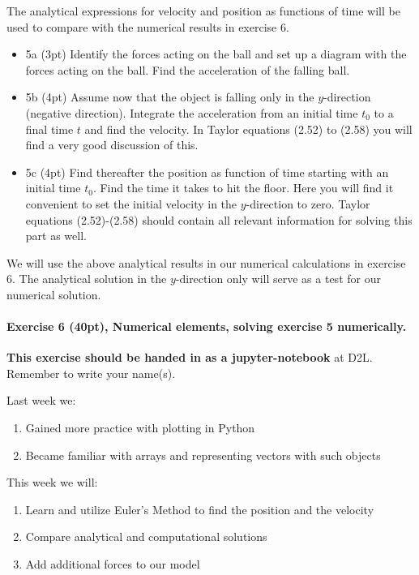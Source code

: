 \documentclass[%
oneside,                 %
final,                   %
10pt]{article}
\begin{document}
The analytical expressions for velocity and position as functions of
time will be used to compare with the numerical results in exercise 6.

\begin{itemize}
\item 5a (3pt) Identify the forces acting on the ball and set up a diagram with the forces acting on the ball. Find the acceleration of the falling ball. 

\item 5b (4pt) Assume now that the object is falling only in the $y$-direction (negative direction). Integrate the acceleration from an initial time $t_0$ to a final time $t$ and find the velocity. In Taylor equations (2.52) to (2.58) you will find a very good discussion of this.

\item 5c (4pt) Find thereafter the position as function of time starting with an initial time $t_0$. Find the time it takes to hit the floor.  Here you will find it convenient to set the initial velocity in the $y$-direction to zero. Taylor equations (2.52)-(2.58) should contain all relevant information for solving this part as well.
\end{itemize}

\noindent
We will use the above analytical results in our numerical calculations in exercise 6. The analytical solution in the $y$-direction only will serve as a test for our numerical solution.

\paragraph{Exercise 6 (40pt), Numerical elements, solving exercise 5 numerically.}
\textbf{This exercise should be handed in as a jupyter-notebook} at D2L. Remember to write your name(s). 

Last week we:
\begin{enumerate}
\item Gained more practice with plotting in Python

\item Became familiar with arrays and representing vectors with such objects
\end{enumerate}

\noindent
This week we will:
\begin{enumerate}
\item Learn and utilize Euler's Method to find the position and the velocity

\item Compare analytical and computational solutions 

\item Add additional forces to our model
\end{enumerate}
\end{document}
